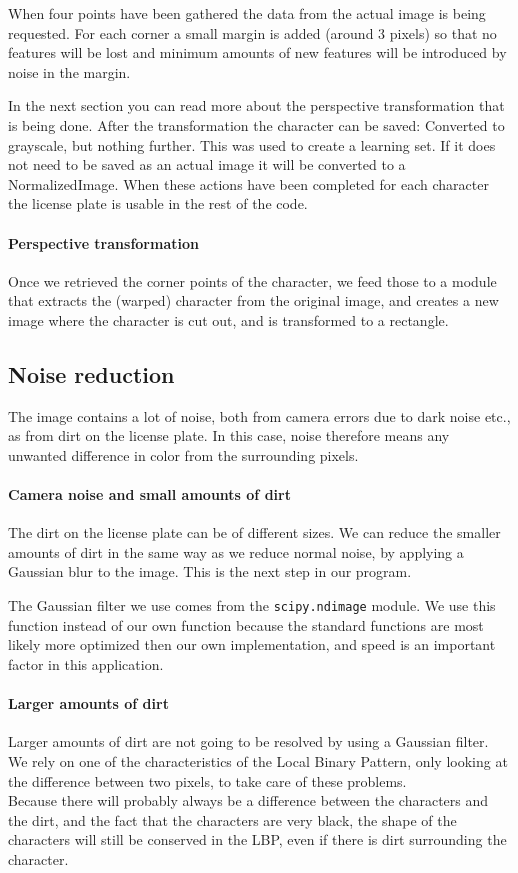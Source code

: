 \documentclass[a4paper]{article}
\begin{document}
When four points have been gathered the data from the actual image is being
requested. For each corner a small margin is added (around 3 pixels) so that no
features will be lost and minimum amounts of new features will be introduced by
noise in the margin.

In the next section you can read more about the perspective transformation that
is being done. After the transformation the character can be saved: Converted
to grayscale, but nothing further. This was used to create a learning set. If
it does not need to be saved as an actual image it will be converted to a
NormalizedImage. When these actions have been completed for each character the
license plate is usable in the rest of the code.

\paragraph*{Perspective transformation}
Once we retrieved the corner points of the character, we feed those to a
module that extracts the (warped) character from the original image, and
creates a new image where the character is cut out, and is transformed to a
rectangle.

\subsection{Noise reduction}

The image contains a lot of noise, both from camera errors due to dark noise
etc., as from dirt on the license plate. In this case, noise therefore means
any unwanted difference in color from the surrounding pixels.

\paragraph*{Camera noise and small amounts of dirt}
The dirt on the license plate can be of different sizes. We can reduce the
smaller amounts of dirt in the same way as we reduce normal noise, by applying
a Gaussian blur to the image. This is the next step in our program.

The Gaussian filter we use comes from the \texttt{scipy.ndimage} module. We use
this function instead of our own function because the standard functions are
most likely more optimized then our own implementation, and speed is an
important factor in this application.

\paragraph*{Larger amounts of dirt}
Larger amounts of dirt are not going to be resolved by using a Gaussian filter.
We rely on one of the characteristics of the Local Binary Pattern, only looking
at the difference between two pixels, to take care of these problems. \\
Because there will probably always be a difference between the characters and
the dirt, and the fact that the characters are very black, the shape of the
characters will still be conserved in the LBP, even if there is dirt
surrounding the character.
\end{document}
